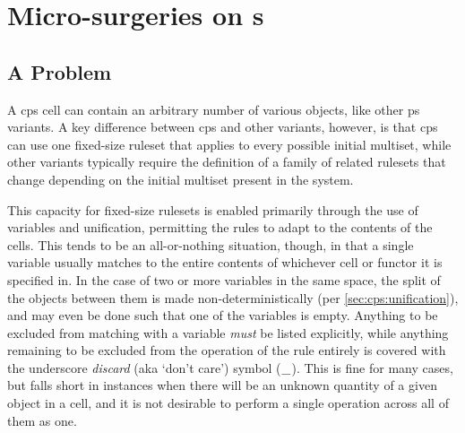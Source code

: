 \section{Micro-surgeries on  s}
\subsection{A Problem}
A \gls{cps} cell can contain an arbitrary number of various objects, like other \gls{ps} variants.  A key difference between \gls{cps} and other variants, however, is that \gls{cps} can use one fixed-size \gls{ruleset} that applies to every possible initial multiset, while other variants typically require the definition of a family of related \glspl{ruleset} that change depending on the initial multiset present in the system.

This capacity for fixed-size \glspl{ruleset} is enabled primarily through the use of variables and unification, permitting the rules to adapt to the contents of the cells.  This tends to be an all-or-nothing situation, though, in that a single variable usually matches to the entire contents of whichever cell or functor it is specified in.  In the case of two or more variables in the same space, the split of the objects between them is made non-deterministically (per \cref{sec:cps:unification}), and may even be done such that one of the variables is empty.  Anything to be excluded from matching with a variable \emph{must} be listed explicitly, while anything remaining to be excluded from the operation of the rule entirely is covered with the underscore \emph{discard} (aka `don't care') symbol (\(\_\)).  This is fine for many cases, but falls short in instances when there will be an unknown quantity of a given object in a cell, and it is not desirable to perform a single operation across all of them as one.



